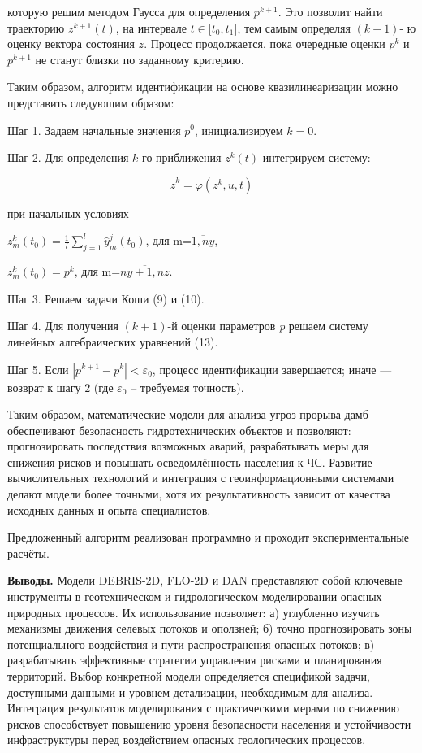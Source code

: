 \begin{multicols}{2}
которую решим методом Гаусса для определения
\(p^{k + 1}\). Это позволит найти траекторию
\(z^{k + 1}(t)\), на интервале
\(t \in \lbrack t_{0},t_{1}\rbrack\), тем самым определяя \((k + 1)\)- ю
оценку вектора состояния \(z\). Процесс продолжается, пока очередные
оценки \(p^{k}\) и
\(p^{k + 1}\) не станут близки по заданному
критерию.

Таким образом, алгоритм идентификации на основе квазилинеаризации можно
представить следующим образом:

Шаг 1. Задаем начальные значения \(p^{0}\),
инициализируем \(k = 0\).

Шаг 2. Для определения \(k\)-го приближения
\(z^{k}(t)\) интегрируем систему:

\[{\dot{z}}^{k} = \varphi(z^{k},u,t)\]

при начальных условиях

\(z_{m}^{k}\left( t_{0} \right) = \frac{1}{l}\sum_{j = 1}^{l}{{\widehat{y}}_{m}^{j}(t_{0})}\),
для m=\(\overline{1,ny}\),

\(z_{m}^{k}\left( t_{0} \right) = p^{k}\),
для m=\(\overline{ny + 1,nz}\).

Шаг 3. Решаем задачи Коши (9) и (10).

Шаг 4. Для получения \((k + 1)\)-й оценки параметров \emph{p} решаем
систему линейных алгебраических уравнений (13).

Шаг 5. Если
\(\left| p^{k + 1} - p^{k} \right| < \varepsilon_{0}\),
процесс идентификации завершается; иначе --- возврат к шагу 2 (где
\(\varepsilon_{0}\) -- требуемая точность).

Таким образом, математические модели для анализа угроз прорыва дамб
обеспечивают безопасность гидротехнических объектов и позволяют:
прогнозировать последствия возможных аварий, разрабатывать меры для
снижения рисков и повышать осведомлённость населения к ЧС. Развитие
вычислительных технологий и интеграция с геоинформационными системами
делают модели более точными, хотя их результативность зависит от
качества исходных данных и опыта специалистов.

Предложенный алгоритм реализован программно и проходит экспериментальные
расчёты.

{\bfseries Выводы.} Модели DEBRIS-2D, FLO-2D и DAN представляют собой
ключевые инструменты в геотехническом и гидрологическом моделировании
опасных природных процессов. Их использование позволяет: а) углубленно
изучить механизмы движения селевых потоков и оползней; б) точно
прогнозировать зоны потенциального воздействия и пути распространения
опасных потоков; в) разрабатывать эффективные стратегии управления
рисками и планирования территорий. Выбор конкретной модели определяется
спецификой задачи, доступными данными и уровнем детализации, необходимым
для анализа. Интеграция результатов моделирования с практическими мерами
по снижению рисков способствует повышению уровня безопасности населения
и устойчивости инфраструктуры перед воздействием опасных геологических
процессов.


\end{multicols}
